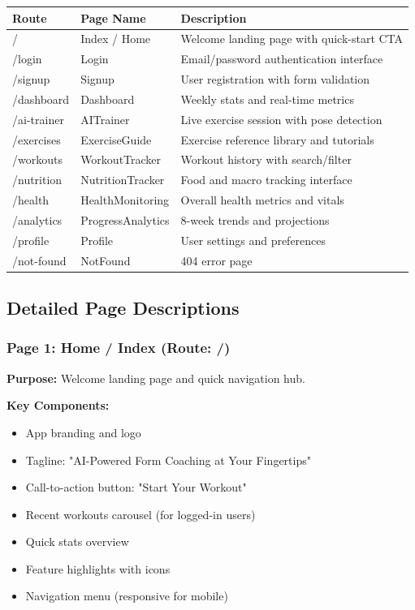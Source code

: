 \documentclass[12pt,a4paper]{article}
\begin{document}
\begin{longtable}{p{2.5cm} p{3.5cm} p{6.5cm}}
\toprule
\textbf{Route} & \textbf{Page Name} & \textbf{Description} \\
\midrule
\endhead
/ & Index / Home & Welcome landing page with quick-start CTA \\
/login & Login & Email/password authentication interface \\
/signup & Signup & User registration with form validation \\
/dashboard & Dashboard & Weekly stats and real-time metrics \\
/ai-trainer & AITrainer & Live exercise session with pose detection \\
/exercises & ExerciseGuide & Exercise reference library and tutorials \\
/workouts & WorkoutTracker & Workout history with search/filter \\
/nutrition & NutritionTracker & Food and macro tracking interface \\
/health & HealthMonitoring & Overall health metrics and vitals \\
/analytics & ProgressAnalytics & 8-week trends and projections \\
/profile & Profile & User settings and preferences \\
/not-found & NotFound & 404 error page \\
\bottomrule
\end{longtable}

\subsection{Detailed Page Descriptions}


\subsubsection*{Page 1: Home / Index (Route: /)}

\textbf{Purpose:} Welcome landing page and quick navigation hub.

\textbf{Key Components:}
\begin{itemize}[noitemsep, topsep=2pt]
  \item App branding and logo
  \item Tagline: "AI-Powered Form Coaching at Your Fingertips"
  \item Call-to-action button: "Start Your Workout"
  \item Recent workouts carousel (for logged-in users)
  \item Quick stats overview
  \item Feature highlights with icons
  \item Navigation menu (responsive for mobile)
\end{itemize}
\end{document}
